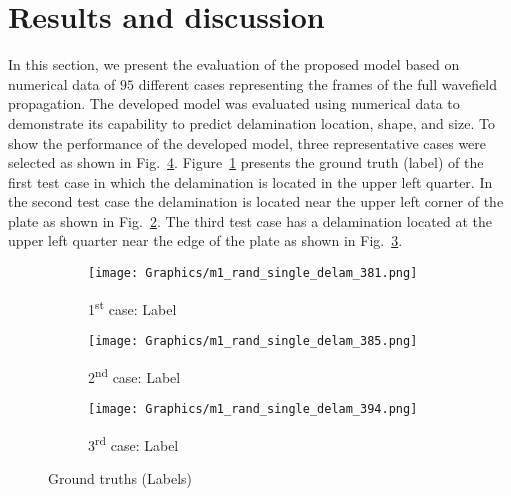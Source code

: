 \documentclass{IOS-Book-Article}
\begin{document}
\section{Results and discussion}
\begin{sloppypar}
	In this section, we present the evaluation of the proposed model based on numerical data of \(95\) different cases representing the frames of the full wavefield propagation.
	The developed model was evaluated using numerical data to demonstrate its capability to predict delamination location, shape, and size.
	To show the performance of the developed model, three representative cases were selected as shown in Fig.~\ref{fig:GT}.
	Figure~\ref{fig:num_GT_381} presents the ground truth (label) of the first test case in which the delamination is located in the upper left quarter.
	In the second test case the delamination is located near the upper left corner of the plate as shown in Fig.~\ref{fig:num_GT_385}.
	The third test case has a delamination located at the upper left quarter near the edge of the plate as shown in Fig.~\ref{fig:num_GT_394}.
	\begin{figure}[ht!]
		\begin{subfigure}[b]{0.32\textwidth}
			\centering
			\texttt{[image: Graphics/m1\_rand\_single\_delam\_381.png]}
			\caption{1\textsuperscript{st} case: Label}
			\label{fig:num_GT_381}
		\end{subfigure}
		\hfill
		\begin{subfigure}[b]{0.32\textwidth}
			\centering
			\texttt{[image: Graphics/m1\_rand\_single\_delam\_385.png]}
			\caption{2\textsuperscript{nd} case: Label}
			\label{fig:num_GT_385}
		\end{subfigure}
		\hfill
		\begin{subfigure}[b]{0.32\textwidth}
			\centering
			\texttt{[image: Graphics/m1\_rand\_single\_delam\_394.png]}
			\caption{3\textsuperscript{rd} case: Label}
			\label{fig:num_GT_394}
		\end{subfigure}
		\caption{Ground truths (Labels)}
		\label{fig:GT}
	\end{figure}
	

\end{sloppypar}
\end{document}

